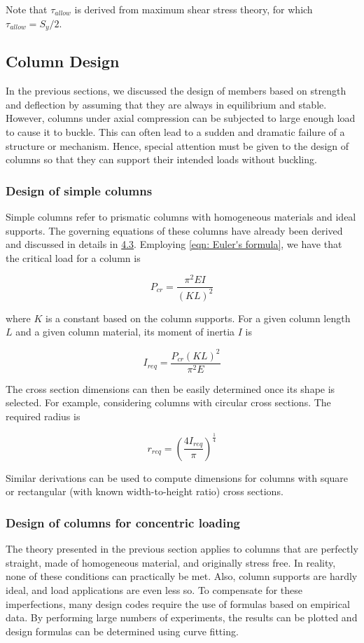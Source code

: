 \documentclass[a4paper,openany,nobib]{tufte-book}
\begin{document}
{{Note that \(\tau_{allow}\) is derived from maximum shear stress theory,
for which \(\tau_{allow} = S_y/2\).

\subsection{Column Design}
\label{column-design}
In the previous sections, we discussed the design of members based on
strength and deflection by assuming that they are always in equilibrium
and stable. However, columns under axial compression can be subjected to
large enough load to cause it to buckle. This can often lead to a sudden
and dramatic failure of a structure or mechanism. Hence, special
attention must be given to the design of columns so that they can
support their intended loads without buckling.

\subsubsection{Design of simple columns}
\label{design-of-simple-columns}
Simple columns refer to prismatic columns with homogeneous materials and
ideal supports. The governing equations of these columns have already
been derived and discussed in details in \hyperref[section: buckling]{4.3}.
Employing \ref{eqn: Euler's formula}, we have
that the critical load for a column is

$$P_{cr} = \frac{\pi ^2EI}{(KL)^2}$$

where \(K\) is a constant based on the column supports. For a given column
length \(L\) and a given column material, its moment of inertia \(I\) is

$$I_{req} = \frac{P_{cr}(KL)^2}{\pi ^2E}$$

The cross section dimensions can then be easily determined once its
shape is selected. For example, considering columns with circular cross
sections. The required radius is

$$r_{req} = \left( \frac{4I_{req}}{\pi } \right)^{\frac{1}{4}}$$

Similar derivations can be used to compute dimensions for columns with
square or rectangular (with known width-to-height ratio) cross sections.

\subsubsection{Design of columns for concentric loading}
\label{subsection: column concentric loading}
The theory presented in the previous section applies to columns that are
perfectly straight, made of homogeneous material, and originally stress
free. In reality, none of these conditions can practically be met. Also,
column supports are hardly ideal, and load applications are even less
so. To compensate for these imperfections, many design codes require the
use of formulas based on empirical data. By performing large numbers of
experiments, the results can be plotted and design formulas can be
determined using curve fitting.

}}
\end{document}
